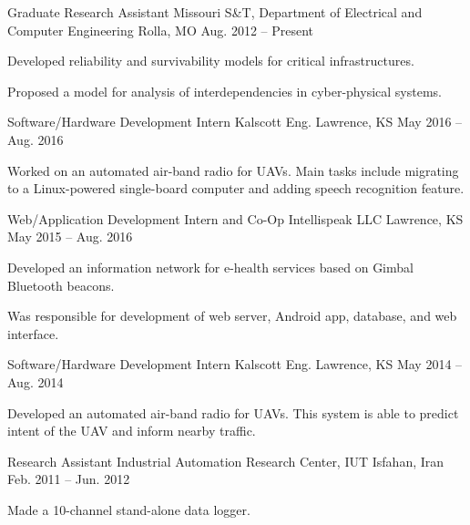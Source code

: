 \begin{cventries}
  \cventry
    {Graduate Research Assistant}
    {Missouri S\&T, Department of Electrical and Computer Engineering}
    {Rolla, MO}
    {Aug. 2012 -- Present}
    {
      \begin{cvitems}
        \item Developed reliability and survivability models for critical infrastructures.
        \item Proposed a model for analysis of interdependencies in cyber-physical systems.
      \end{cvitems}
    }
  \cventry
    {Software/Hardware Development Intern}
    {Kalscott Eng.}
    {Lawrence, KS}
    {May 2016 -- Aug. 2016}
    {
      \begin{cvitems}
        \item Worked on an automated air-band radio for UAVs. Main tasks include migrating to a Linux-powered single-board computer and adding speech recognition feature.
      \end{cvitems}
    }
  \cventry
    {Web/Application Development Intern and Co-Op}
    {Intellispeak LLC}
    {Lawrence, KS}
    {May 2015 -- Aug. 2016}
    {
      \begin{cvitems}
        \item Developed an information network for e-health services based on Gimbal Bluetooth beacons.
        \item Was responsible for development of web server, Android app, database, and web interface.
      \end{cvitems}
    }
  \cventry
    {Software/Hardware Development Intern}
    {Kalscott Eng.}
    {Lawrence, KS}
    {May 2014 -- Aug. 2014}
    {
      \begin{cvitems}
        \item Developed an automated air-band radio for UAVs. This system is able to predict intent of the UAV and inform nearby traffic.
      \end{cvitems}
    }
  \cventry
    {Research Assistant}
    {Industrial Automation Research Center, IUT}
    {Isfahan, Iran}
    {Feb. 2011 -- Jun. 2012}
    {
      \begin{cvitems}
        \item Made a 10-channel stand-alone data logger.

\end{cvitems}}
\end{cventries}
